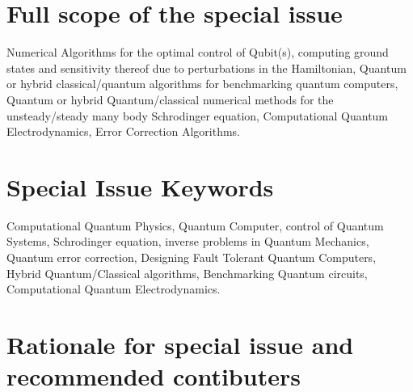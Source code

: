 \documentclass[]{article}
\begin{document}
 
\section{Full scope of the special issue }

Numerical Algorithms for the optimal control of Qubit(s), computing ground states and sensitivity thereof due to perturbations in the Hamiltonian, Quantum or hybrid classical/quantum algorithms for benchmarking quantum computers, Quantum or hybrid Quantum/classical numerical methods for the unsteady/steady many body Schrodinger equation, Computational Quantum Electrodynamics,
Error Correction Algorithms.

\section{Special Issue Keywords }

Computational Quantum Physics, Quantum Computer, control of Quantum Systems, Schrodinger equation, inverse problems in Quantum Mechanics, Quantum error correction, Designing Fault Tolerant Quantum Computers, Hybrid Quantum/Classical algorithms, Benchmarking Quantum circuits, Computational Quantum Electrodynamics.

\section{Rationale for special issue and recommended contibuters}

\begin{comment}

\cite{BLATT1967382}
``Practical points concerning the solution of the Schrödinger equation''
\cite{FEIT1982412}
``Solution of the Schrödinger equation by a spectral method''
\cite{https://doi.org/10.1002/andp.19273892002}
``Zur Quantentheorie der Molekeln''
\cite{wang2020localization}
``Localization and delocalization of light in photonic moir{\'e} lattices''
``Approximating spectral densities of large matrices''
\cite{ramkarthik2021numerical}
``Numerical recipes in quantum information theory and quantum computing: an adventure in FORTRAN 90''
\cite{yeomans1988theory}
``The theory and application of axial Ising models''
\cite{milburn2000ion}
``Ion trap quantum computing with warm ions''

\cite{shastri2021photonics}
``Photonics for artificial intelligence and neuromorphic computing''

\cite{wanjura2024fully}
``Fully nonlinear neuromorphic computing with linear wave scattering''
\cite{de2024spin}
``A spin-optical quantum computing architecture''
\cite{heurtel2023perceval}
``Perceval: A software platform for discrete variable photonic quantum computing''
\cite{wiebe2014quantum}
``Quantum deep learning''

\end{comment}
\end{document}
